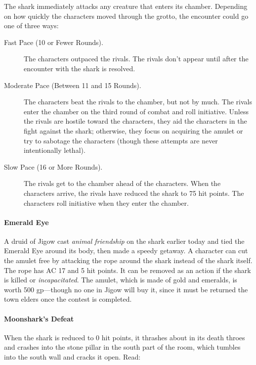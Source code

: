 \documentclass[letterpaper, 11pt, bg=full, twocolumn]{dndbook}
\begin{document}
The shark immediately attacks any creature that enters its chamber. Depending on how quickly the characters moved through the grotto, the encounter could go one of three ways:

\begin{description}
\item[Fast Pace (10 or Fewer Rounds).] The characters outpaced the rivals. The rivals don't appear until after the encounter with the shark is resolved.
\item[Moderate Pace (Between 11 and 15 Rounds).] The characters beat the rivals to the chamber, but not by much. The rivals enter the chamber on the third round of combat and roll initiative. Unless the rivals are hostile toward the characters, they aid the characters in the fight against the shark; otherwise, they focus on acquiring the amulet or try to sabotage the characters (though these attempts are never intentionally lethal).
\item[Slow Pace (16 or More Rounds).] The rivals get to the chamber ahead of the characters. When the characters arrive, the rivals have reduced the shark to 75 hit points. The characters roll initiative when they enter the chamber.
\end{description}

\paragraph{Emerald Eye}

A druid of Jigow cast \textit{animal friendship} on the shark earlier today and tied the Emerald Eye around its body, then made a speedy getaway. A character can cut the amulet free by attacking the rope around the shark instead of the shark itself. The rope has AC 17 and 5 hit points. It can be removed as an action if the shark is killed or \textit{incapacitated}. The amulet, which is made of gold and emeralds, is worth 500 gp---though no one in Jigow will buy it, since it must be returned the town elders once the contest is completed.

\paragraph{Moonshark's Defeat}

When the shark is reduced to 0 hit points, it thrashes about in its death throes and crashes into the stone pillar in the south part of the room, which tumbles into the south wall and cracks it open. Read:
\end{document}
